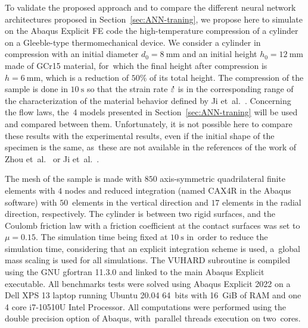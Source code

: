 \documentclass[algorithms,article,accept,pdftex,oneauthors]{Definitions/mdpi}
\DeclareRobustCommand{\mdot}[1]{\accentset{\mbox{\bfseries .}}{#1}}
\begin{document}
To validate the proposed approach and to compare the different neural network architectures proposed in Section~\ref{sec:ANN-traning}, we propose here to simulate on the Abaqus Explicit FE code the high-temperature compression of a cylinder on a Gleeble-type thermomechanical device.
We consider a cylinder in compression with an initial diameter $d_0=8~\text{mm}$ and an initial height $h_0=12~\text{mm}$ made of GCr15 material, for~which the final height after compression is $h=6~\text{mm}$, which is a reduction of $50\%$ of its total height.
The compression of the sample is done in $10~\text{s}$ so that the strain rate  $\mdot\varepsilon$ is in the corresponding range of the characterization of the material behavior defined by Ji et~al.~\cite{Ji-2018}.
Concerning the flow laws, the~4 models presented in Section~\ref{sec:ANN-traning} will be used and compared between them.
Unfortunately, it is not possible here to compare these results with the experimental results, even if the initial shape of the specimen is the same, as~these are not available in the references of the work of Zhou et~al.~\cite{Zhou-2020} or Ji et~al.~\cite{Ji-2018}.

The mesh of the sample is made with $850$ axis-symmetric quadrilateral finite elements with $4$ nodes and reduced integration (named CAX4R in the Abaqus software) with $50$~elements in the vertical direction and $17$ elements in the radial direction, respectively.
The cylinder is between two rigid surfaces, and the Coulomb friction law with a friction coefficient at the contact surfaces was set to $\mu=0.15$.
The simulation time being fixed at $10~\text{s}$ in~order to reduce the simulation time, considering that an explicit integration scheme is used, a~global mass scaling is used for all simulations.
The VUHARD subroutine is compiled using the GNU gfortran 11.3.0 and linked to the main Abaqus Explicit executable.
All benchmarks tests were solved using Abaqus Explicit 2022 on a Dell XPS 13 laptop running Ubuntu 20.04 64~bits with 16~GiB of RAM and one 4 core i7-10510U Intel Processor.
All computations were performed using the double precision option of Abaqus, with~parallel threads execution on two~cores.
\end{document}
